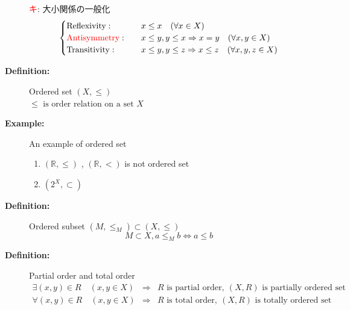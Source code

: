 \documentclass[english,dvipdfmx]{jsarticle}
\newcommand*{\point}{\textcircled{\textcolor{red}{\scriptsize キ}}}
\begin{document}
\begin{description}
    \point : 大小関係の一般化
    \begin{equation*}
    \begin{cases}
        \text{Reflexivity} : \quad &x\leq x \quad ( \forall x \in X )  \\
        \text{\color{red} Antisymmetry} : \quad  &x\leq y ,y\leq x \Rightarrow x=y \quad ( \forall x,y \in X ) \\
        \text{Transitivity} : \quad &x\leq y , y\leq z \Rightarrow x\leq z \quad (\forall x,y,z \in X )
    \end{cases}
    \end{equation*}
    \item[\bf{Definition:}] Ordered set $(X , \leq)$ \\
        $\leq \text{ is order relation on a set }X$ 
    \item[\bf{Example:}] An example of ordered set
    \begin{enumerate}
        \item $ (\mathbb{R},\leq) $ , $ (\mathbb{R},<) $ is not ordered set
        \item $ ( 2^X,\subset) $
    \end{enumerate}
    \item[\bf{Definition:}] Ordered subset $(M,\leq_M) \subset (X, \leq)$
    \begin{equation*} 
        M \subset X , a \leq_M b \Leftrightarrow a \leq b
    \end{equation*}
    \item[\bf{Definition:}] Partial order and total order
    \begin{eqnarray*} 
        \exists (x,y) \in R \quad ( x,y \in X ) &\Rightarrow& R \text{ is partial order} ,\ (X , R) \text{ is partially ordered set} \\
        \forall (x,y) \in R \quad ( x,y \in X ) &\Rightarrow& R \text{ is total order} ,\ (X , R) \text{ is totally ordered set}
    \end{eqnarray*}
\end{description}
\newpage
\end{document}
